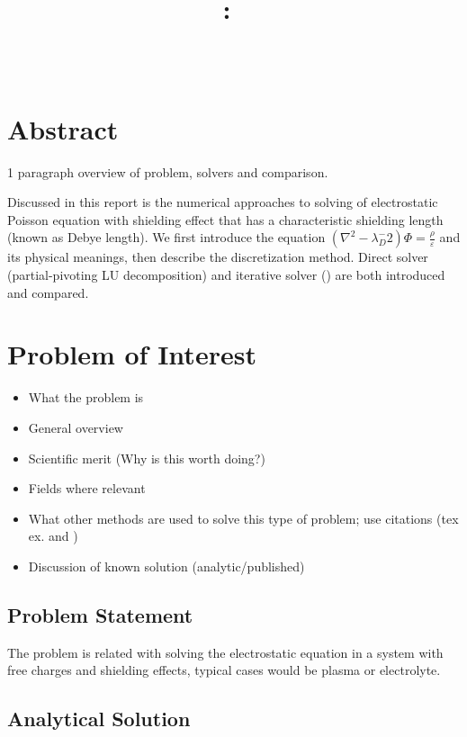 \documentclass{article}
\title{\vspace{2in}\textmd{\textbf{\hmwkClass:\ \hmwkTitle}} \\
\vspace{0.1in}\large{ \hmwkClassTime}\vspace{3in}}
\author{\textbf{\hmwkAuthorName} \\ \vspace{0.1in}
\hmwkDueDate }
\date{} %
\begin{document}
\begin{spacing}{1.1}
\maketitle

\newpage
\section*{Abstract}

1 paragraph overview of problem, solvers and comparison.

Discussed in this report is the numerical approaches to solving of electrostatic Poisson equation with shielding effect that has a characteristic shielding length (known as Debye length). We first introduce the equation $(\nabla^2 - \lambda_D^-2)\Phi =\frac{\rho}{\varepsilon}$ and its physical meanings, then describe the discretization method. Direct solver (partial-pivoting LU decomposition) and iterative solver () are both introduced and compared.

\section{Problem of Interest}

\begin{itemize}
    \item What the problem is
    \item General overview
    \item Scientific merit (Why is this worth doing?)
    \item Fields where relevant
    \item What other methods are used to solve this type of problem; use citations (tex ex. \cite{anderson1995computational} and \cite{wilcox1998turbulence})
    \item Discussion of known solution (analytic/published)
\end{itemize}

\subsection{Problem Statement}

The problem is related with solving the electrostatic equation in a system with free charges and shielding effects, typical cases would be plasma or electrolyte.

\subsection{Analytical Solution}


\end{spacing}
\end{document}
